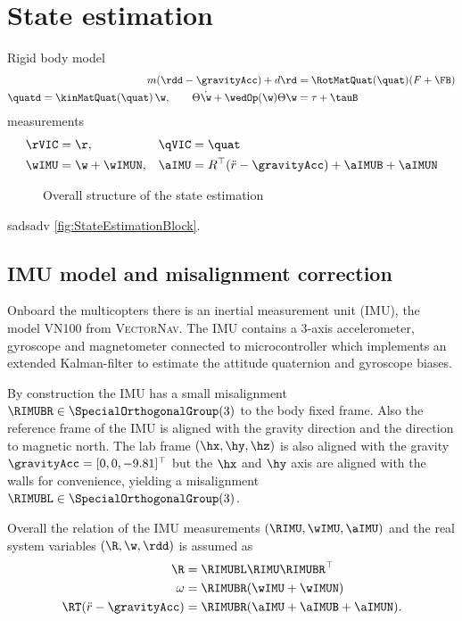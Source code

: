 \section{State estimation}\label{sec:RealizationStateEstimation}
Rigid body model
\begin{align}
 m (\rdd - \gravityAcc) + d \rd &= \RotMatQuat(\quat) (F + \FB)
\\
 \quatd = \kinMatQuat(\quat) \, \w, \qquad
 \Theta \dot{\w} + \wedOp(\w) \Theta \w &= \tau + \tauB
\end{align}
measurements
\begin{align}
 \rVIC &= \r,&
 \qVIC &= \quat
\\
 \wIMU &= \w + \wIMUN,&
 \aIMU &=  R^\top (\ddot{r} - \gravityAcc) + \aIMUB + \aIMUN
\end{align}

\begin{figure}[ht]
 \centering
 
 \caption{Overall structure of the state estimation}
 \label{fig:StateEstimationBlock}
\end{figure}

sadsadv \autoref{fig:StateEstimationBlock}.


\subsection{IMU model and misalignment correction}
Onboard the multicopters there is an inertial measurement unit (IMU), the model VN100 from \textsc{VectorNav}.
The IMU contains a 3-axis accelerometer, gyroscope and magnetometer connected to microcontroller which implements an extended Kalman-filter to estimate the attitude quaternion and gyroscope biases.

By construction the IMU has a small misalignment $\RIMUBR \in \SpecialOrthogonalGroup(3)$ to the body fixed frame.
Also the reference frame of the IMU is aligned with the gravity direction and the direction to magnetic north.
The lab frame $(\hx, \hy, \hz)$ is also aligned with the gravity $\gravityAcc = [0,0,-9.81]^\top$ but the $\hx$ and $\hy$ axis are aligned with the walls for convenience, yielding a misalignment $\RIMUBL \in \SpecialOrthogonalGroup(3)$.

Overall the relation of the IMU measurements $(\RIMU, \wIMU, \aIMU)$ and the real system variables $(\R, \w, \rdd)$ is assumed as
\begin{subequations}
\begin{align}
 \R &= \RIMUBL \RIMU \RIMUBR^\top
\\
 \omega &= \RIMUBR (\wIMU + \wIMUN)
\\
 \RT (\ddot{r} - \gravityAcc) &= \RIMUBR (\aIMU + \aIMUB + \aIMUN).
\end{align}
\end{subequations}

